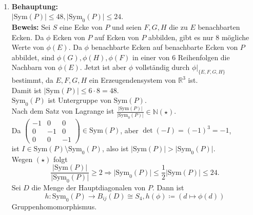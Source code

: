 \begin{solution}
  \
  \begin{enumerate}[label= (\alph*)] 
    \item \textbf{Behauptung:} \\
    \( \vert \text{Sym}(P) \vert \leq 48, \vert \text{Sym}_0(P) \vert \leq 24 \). \\
    \textbf{Beweis:} Sei \( S \) eine Ecke von \( P \) und seien \( F,G,H \) die zu \( E \) benachbarten Ecken. Da \( \phi \) Ecken von \( P \) auf Ecken von \( P \) abbilden, gibt es nur 8 mögliche Werte von \( \phi(E) \). Da \( \phi \) benachbarte Ecken auf benachbarte Ecken von \( P \) abbildet, sind \( \phi(G), \phi(H), \phi(F) \) in einer von 6 Reihenfolgen die Nachbarn von \( \phi(E) \). Jetzt ist aber \( \phi \) vollständig durch \( \phi|_{\{ E,F,G,H \}} \) bestimmt, da \( E,F,G,H \) ein Erzeugendensystem von \( \mathbb{R}^3 \) ist. \\
    Damit ist \( \vert \text{Sym}(P) \vert \leq 6 \cdot 8 = 48 \). \\
    \( \text{Sym}_0(P) \) ist Untergruppe von \( \text{Sym}(P) \). \\
    Nach dem Satz von Lagrange ist \( \frac{\vert \text{Sym}(P) \vert}{\vert \text{Sym}_0(P) \vert} \in \mathbb{N} (\star) \). \\
    Da \( \begin{pmatrix}
      -1 & 0 & 0 \\
      0 & -1 & 0 \\
      0 & 0 & -1 
    \end{pmatrix} \in \text{Sym}(P) \), aber \( \det(-I) = {(-1)}^3 = -1 \),\\
    ist \( I \in \text{Sym}(P) \setminus \text{Sym}_0(P) \), also ist \( \vert \text{Sym}(P) \vert > \vert \text{Sym}_0(P) \vert \). \\
    Wegen \( (\star) \) folgt
    \begin{equation*}
      \frac{\vert \text{Sym}(P) \vert}{\vert \text{Sym}_0(P) \vert} \geq 2 \Rightarrow \vert \text{Sym}_0(P) \vert \leq \frac{1}{2} \vert \text{Sym}(P) \vert \leq 24.
    \end{equation*}
    Sei \( D \) die Menge der Hauptdiagonalen von \( P \). Dann ist 
    \begin{equation*}
      h: \text{Sym}_0(P) \to B_{ij}(D) \cong S_4, h(\phi) \coloneqq (d \mapsto \phi(d))
    \end{equation*}
    Gruppenhomomorphismus. \\
    

\end{enumerate}
\end{solution}
